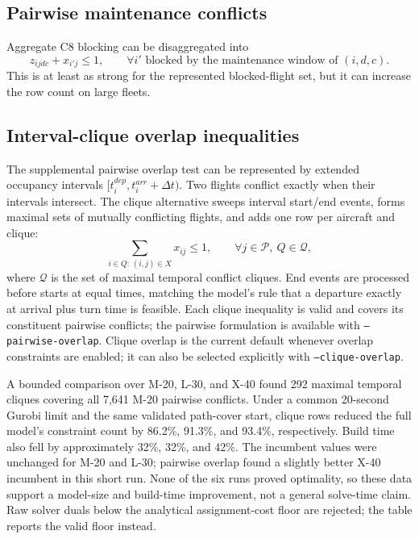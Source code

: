 \subsection{Pairwise maintenance conflicts}

Aggregate C8 blocking can be disaggregated into
\begin{equation}
    z_{ijdc}+x_{i'j}\leq 1,
    \qquad \forall i'\text{ blocked by the maintenance window of }(i,d,c).
    \label{eq:strength_pairwise_conflict}
\end{equation}
This is at least as strong for the represented blocked-flight set, but it can
increase the row count on large fleets.

\subsection{Interval-clique overlap inequalities}

The supplemental pairwise overlap test can be represented by extended
occupancy intervals $[t_i^{dep},t_i^{arr}+\Delta t)$. Two flights conflict
exactly when their intervals intersect. The clique alternative sweeps interval
start/end events, forms maximal sets of mutually conflicting flights, and adds
one row per aircraft and clique:
\begin{equation}
    \sum_{i\in Q:\,(i,j)\in X}x_{ij}\leq 1,
    \qquad \forall j\in\mathcal{P},\ Q\in\mathcal{Q},
    \label{eq:strength_clique_overlap}
\end{equation}
where $\mathcal{Q}$ is the set of maximal temporal conflict cliques. End events
are processed before starts at equal times, matching the model's rule that a
departure exactly at arrival plus turn time is feasible. Each clique inequality
is valid and covers its constituent pairwise conflicts; the pairwise
formulation is available with \texttt{--pairwise-overlap}. Clique overlap is
the current default whenever overlap constraints are enabled; it can also be
selected explicitly with \texttt{--clique-overlap}.

A bounded comparison over M-20, L-30, and X-40 found 292 maximal temporal
cliques covering all 7,641 M-20 pairwise conflicts. Under a common 20-second
Gurobi limit and the same validated path-cover start, clique rows reduced the
full model's constraint count by 86.2\%, 91.3\%, and 93.4\%, respectively.
Build time also fell by approximately 32\%, 32\%, and 42\%. The incumbent
values were unchanged for M-20 and L-30; pairwise overlap found a slightly
better X-40 incumbent in this short run. None of the six runs proved
optimality, so these data support a model-size and build-time improvement, not
a general solve-time claim. Raw solver duals below the analytical
assignment-cost floor are rejected; the table reports the valid floor instead.

